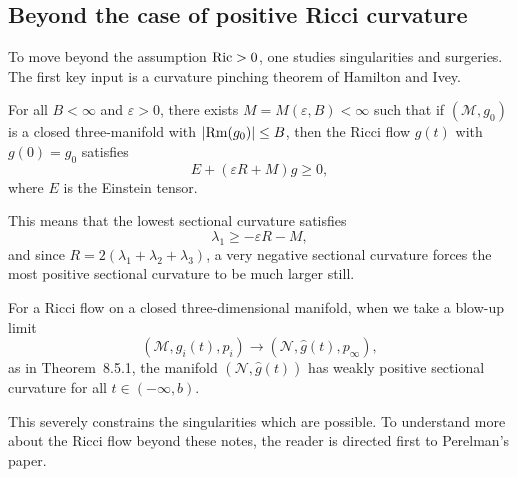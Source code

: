 \subsection{Beyond the case of positive Ricci curvature}

To move beyond the assumption \(\operatorname{Ric} > 0\), one studies singularities and
surgeries. The first key input is a curvature pinching theorem of Hamilton and
Ivey.

\begin{theorem}
\label{topping-ch10-hamilton-ivey-theorem}
For all \(B < \infty\) and \(\varepsilon > 0\), there exists
\(M = M(\varepsilon,B) < \infty\) such that if \((\mathcal{M}, g_0)\) is a
closed three-manifold with \(\lvert \operatorname{Rm}(g_0)\rvert \leq B\), then the Ricci flow
\(g(t)\) with \(g(0) = g_0\) satisfies
\[
E + (\varepsilon R + M)g \geq 0,
\]
where \(E\) is the Einstein tensor.
\end{theorem}

This means that the lowest sectional curvature satisfies
\[
\lambda_1 \geq -\varepsilon R - M,
\]
and since \(R = 2(\lambda_1 + \lambda_2 + \lambda_3)\), a very negative
sectional curvature forces the most positive sectional curvature to be much
larger still.

\begin{corollary}
\label{topping-ch10-blowup-weakly-positive}
For a Ricci flow on a closed three-dimensional manifold, when we take a
blow-up limit
\[
(\mathcal{M}, g_i(t), p_i) \to (\mathcal{N}, \hat{g}(t), p_\infty),
\]
as in Theorem~8.5.1, the manifold \((\mathcal{N}, \hat{g}(t))\) has weakly
positive sectional curvature for all \(t \in (-\infty, b)\).
\end{corollary}

\begin{remark}
\label{topping-ch10-perelman-reference}
This severely constrains the singularities which are possible. To understand
more about the Ricci flow beyond these notes, the reader is directed first to
Perelman's paper.
\end{remark}
